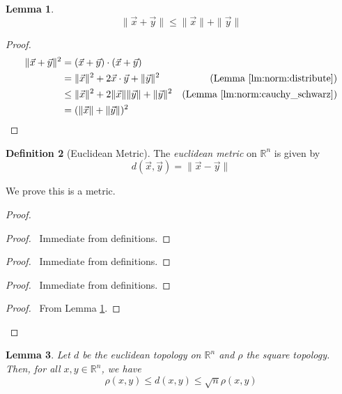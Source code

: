 \documentclass{report}
\let\qed\relax
\newtheorem{lm}{Lemma}[section]
\theoremstyle{definition}
\newtheorem{df}[lm]{Definition}
\begin{document}
  \begin{lm}
    \label{lm:norm:triangle}
    \[ \| \vec{x} + \vec{y} \| \leq \| \vec{x} \| + \| \vec{y} \| \]
  \end{lm}

  \begin{proof}
    \pf
    \begin{align*}
      \| \vec{x} + \vec{y} \|^2 & = (\vec{x} + \vec{y}) \cdot (\vec{x} +
      \vec{y}) \\
      & = \| \vec{x} \| ^2 + 2 \vec{x} \cdot \vec{y} + \| \vec{y} \|^2 &
      (\text{Lemma \ref{lm:norm:distribute}}) \\
      & \leq \| \vec{x} \|^2 + 2 \| \vec{x} \| \| \vec{y} \| + \| \vec{y} \|^2
      &
      (\text{Lemma \ref{lm:norm:cauchy_schwarz}}) \\
      & = (\| \vec{x} \| + \| \vec{y} \|)^2 & \qed
    \end{align*}
  \end{proof}

  \begin{df}[Euclidean Metric]
    The \emph{euclidean metric} on $\mathbb{R}^n$ is given by
    \[ d(\vec{x}, \vec{y}) = \| \vec{x} - \vec{y} \| \]

    We prove this is a metric.
  \end{df}

  \begin{proof}
    \pf
    \begin{proof}
      \pf\ Immediate from definitions.
    \end{proof}
    \begin{proof}
      \pf\ Immediate from definitions.
    \end{proof}
    \begin{proof}
      \pf\ Immediate from definitions.
    \end{proof}
    \begin{proof}
      \pf\ From Lemma \ref{lm:norm:triangle}.
    \end{proof}
    \qed
  \end{proof}

  \begin{lm}
    \label{lm:topology:metric:euclidean_square}
    Let $d$ be the euclidean topology on $\mathbb{R}^n$ and $\rho$ the square
    topology. Then, for all $x, y \in \mathbb{R}^n$, we have
    \[ \rho(x, y) \leq d(x, y) \leq \sqrt{n} \rho(x, y) \]
  \end{lm}
\end{document}
